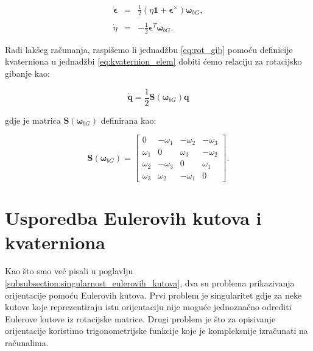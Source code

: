 \documentclass[times, utf8, diplomski, numeric]{templates/template}
\begin{document}
{{{            \begin{equation}
            \label{eq:rot_gib}
            \begin{array}{rcl}
                \dot{\boldsymbol\epsilon} &  = & \frac{1}{2}(\eta\boldsymbol{1} + \boldsymbol{\epsilon}^\times)\boldsymbol{\omega}_{bG}, \\
                & & \\
                \dot{\eta} & = & -\frac{1}{2}\boldsymbol{\epsilon}^T\boldsymbol{\omega}_{bG}.
            \end{array}
            \end{equation}

            Radi lakšeg računanja, raspišemo li jednadžbu \ref{eq:rot_gib} pomoću definicije kvaterniona u jednadžbi \ref{eq:kvaternion_elem} dobiti ćemo relaciju za rotacijsko gibanje \cite{uvod_u_svemirske} kao:

            \begin{equation}
            \label{eq:rot_qib_elem}
                \dot{\boldsymbol{q}} = \frac{1}{2} \boldsymbol{S}(\boldsymbol{\omega}_{bG}) \boldsymbol{q}
            \end{equation}

            gdje je matrica $\boldsymbol{S}(\boldsymbol{\omega}_{bG})$ definirana kao:

            \begin{equation}
                \boldsymbol{S}(\boldsymbol{\omega}_{bG}) =
                \begin{bmatrix}
                    0        & -\omega_1    & -\omega_2 & -\omega_3 \\
                    \omega_1 &     0        & \omega_3  & -\omega_2 \\
                    \omega_2 & -\omega_3    &    0      & \omega_1 \\
                    \omega_3 & \omega_2     & -\omega_1 &     0 
                \end{bmatrix}
                .
            \end{equation}
        }
    }

    \section{Usporedba Eulerovih kutova i kvaterniona}{
        Kao što smo već pisali u poglavlju \ref{subsubsection:singularnost_eulerovih_kutova}, dva su problema prikazivanja orijentacije pomoću Eulerovih kutova. Prvi problem je singularitet gdje za neke kutove koje reprezentiraju istu orijentaciju nije moguće jednoznačno odrediti Eulerove kutove iz rotacijske matrice. Drugi problem je što za opisivanje orijentacije koristimo trigonometrijske funkcije koje je kompleksnije izračunati na računalima.

}}
\end{document}
